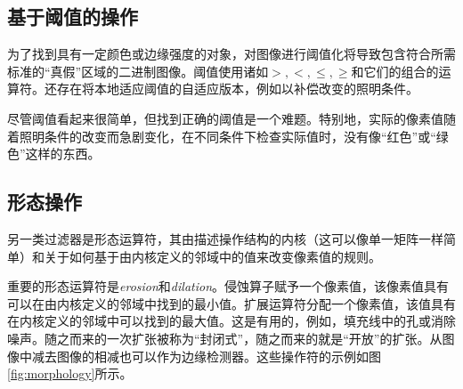 
\subsection{基于阈值的操作}
为了找到具有一定颜色或边缘强度的对象，对图像进行阈值化将导致包含符合所需标准的“真假”区域的二进制图像。阈值使用诸如$>,<,\leq,\geq$和它们的组合的运算符。还存在将本地适应阈值的自适应版本，例如以补偿改变的照明条件。

尽管阈值看起来很简单，但找到正确的阈值是一个难题。特别地，实际的像素值随着照明条件的改变而急剧变化，在不同条件下检查实际值时，没有像“红色”或“绿色”这样的东西。




\subsection{形态操作}
另一类过滤器是形态运算符，其由描述操作结构的内核（这可以像单一矩阵一样简单）和关于如何基于由内核定义的邻域中的值来改变像素值的规则。

重要的形态运算符是\emph{erosion}和\emph{dilation}。侵蚀算子赋予一个像素值，该像素值具有可以在由内核定义的邻域中找到的最小值。扩展运算符分配一个像素值，该值具有在内核定义的邻域中可以找到的最大值。这是有用的，例如，填充线中的孔或消除噪声。随之而来的一次扩张被称为“封闭式”，随之而来的就是“开放”的扩张。从图像中减去图像的相减也可以作为边缘检测器。这些操作符的示例如图\ref{fig:morphology}所示。


